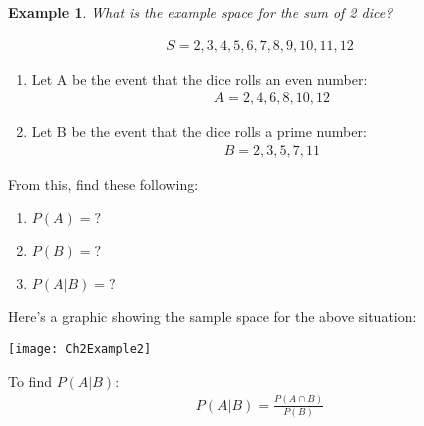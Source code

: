\documentclass[../IND E 315.tex]{subfiles}
\newtheorem{exmp}{Example}
\begin{document}
\begin{exmp}
    What is the example space for the sum of 2 dice?
\end{exmp}
\begin{equation*}
    \begin{aligned}
        S = {2,3,4,5,6,7,8,9,10,11,12}
    \end{aligned}
\end{equation*}
\begin{enumerate}
    \item Let A be the event that the dice rolls an even number:
        \begin{equation*}
            \begin{aligned}
                A = {2,4,6,8,10,12}
            \end{aligned}
        \end{equation*}
    \item Let B be the event that the dice rolls a prime number:
        \begin{equation*}
            \begin{aligned}
                B = {2,3,5,7,11}
            \end{aligned}
        \end{equation*}
\end{enumerate}
From this, find these following:
\begin{enumerate}
    \item $P(A) = ?$
    \item $P(B) = ?$ 
    \item $P(A|B) = ?$
\end{enumerate}

Here's a graphic showing the sample space for the above situation:
    \begin{center}
        \texttt{[image: Ch2Example2]}
    \end{center}
To find $P(A|B)$:
\begin{equation*}
    \begin{aligned}
        P(A|B) = \frac{P(A \cap B)}{P(B)}
    \end{aligned}
\end{equation*}
\end{document}
